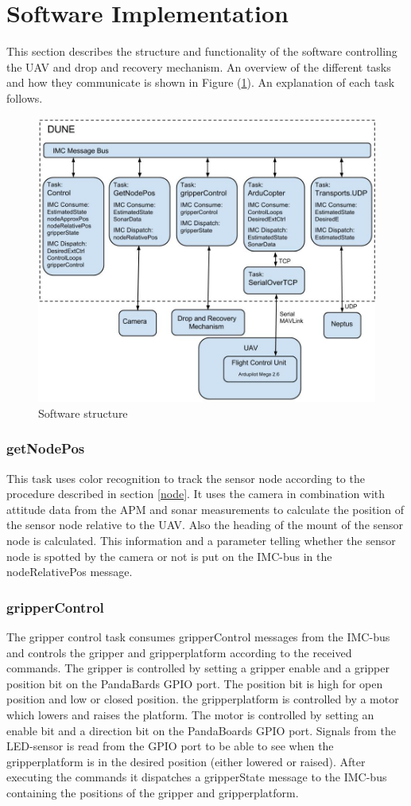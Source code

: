 \section{Software Implementation}
This section describes the structure and functionality of the software controlling the UAV and drop and recovery mechanism. An overview of the different tasks and how they communicate is shown in Figure (\ref{SW}). An explanation of each task follows.
\label{control_SW}
\begin{figure}[H]
\centering
\includegraphics[width = 12cm]{fig/SW.jpg}
\caption{Software structure}
\label{SW}
\end{figure}
\subsubsection*{getNodePos}
This task uses color recognition to track the sensor node according to the procedure described in section \ref{node}. It uses the camera in combination with attitude data from the APM and sonar measurements to calculate the position of the sensor node relative to the UAV. Also the heading of the mount of the sensor node is calculated. This information and a parameter telling whether the sensor node is spotted by the camera or not is put on the IMC-bus in the nodeRelativePos message.
\subsubsection*{gripperControl}
The gripper control task consumes gripperControl messages from the IMC-bus and controls the gripper and gripperplatform according to the received commands. The gripper is controlled by setting a gripper enable and a gripper position bit on the PandaBards GPIO port. The position bit is high for open position and low or closed position. the gripperplatform is controlled by a motor which lowers and raises the platform. The motor is controlled by setting an enable bit and a direction bit on the PandaBoards GPIO port. Signals from the LED-sensor is read from the GPIO port to be able to see when the gripperplatform is in the desired position (either lowered or raised). After executing the commands it dispatches a gripperState message to the IMC-bus containing the positions of the gripper and gripperplatform.
